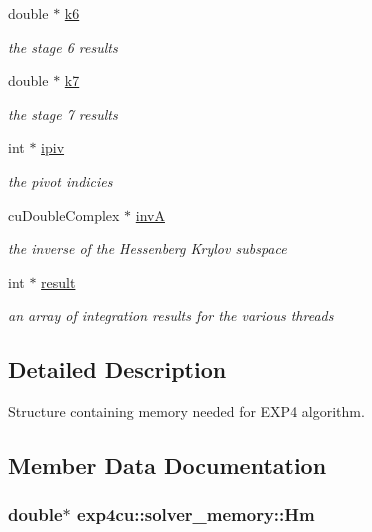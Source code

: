 \begin{DoxyCompactItemize}
double $\ast$ \hyperlink{structexp4cu_1_1solver__memory_a8ccbe7fd464f064245b77c2df44956ef}{k6}
\begin{DoxyCompactList}\small\item\em the stage 6 results \end{DoxyCompactList}\item 
double $\ast$ \hyperlink{structexp4cu_1_1solver__memory_aa2776a2d992080e4e4c3e557c26ba2f7}{k7}
\begin{DoxyCompactList}\small\item\em the stage 7 results \end{DoxyCompactList}\item 
int $\ast$ \hyperlink{structexp4cu_1_1solver__memory_a906f92c7521970bb4682737769d0b854}{ipiv}
\begin{DoxyCompactList}\small\item\em the pivot indicies \end{DoxyCompactList}\item 
cu\+Double\+Complex $\ast$ \hyperlink{structexp4cu_1_1solver__memory_a7e113949ec6861bbdf232d99badd8ed9}{invA}
\begin{DoxyCompactList}\small\item\em the inverse of the Hessenberg Krylov subspace \end{DoxyCompactList}\item 
int $\ast$ \hyperlink{structexp4cu_1_1solver__memory_aa0f66d6db2a4db2d779ff4dc407821b5}{result}
\begin{DoxyCompactList}\small\item\em an array of integration results for the various threads \end{DoxyCompactList}\end{DoxyCompactItemize}


\subsection{Detailed Description}
Structure containing memory needed for E\+X\+P4 algorithm. 

\subsection{Member Data Documentation}
\subsubsection[{\texorpdfstring{Hm}{Hm}}]{\setlength{\rightskip}{0pt plus 5cm}double$\ast$ exp4cu\+::solver\+\_\+memory\+::\+Hm}\hypertarget{structexp4cu_1_1solver__memory_aed9282a748435b4cc9e230bd92b9b91f}{}\label{structexp4cu_1_1solver__memory_aed9282a748435b4cc9e230bd92b9b91f}



